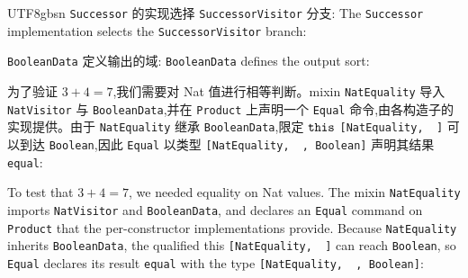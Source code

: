 \begin{CJK*}{UTF8}{gbsn}
\ifPaperChinese
  \texttt{Successor} 的实现选择 \texttt{SuccessorVisitor} 分支:
  \else
  The \texttt{Successor} implementation selects the \texttt{SuccessorVisitor} branch:
  \fi
{}

\ifPaperChinese
  \texttt{BooleanData} 定义输出的域:
  \else
  \texttt{BooleanData} defines the output sort:
  \fi
{}
\ifPaperChinese
  \begin{sloppypar}
  为了验证 $3 + 4 = 7$,我们需要对 Nat 值进行相等判断。mixin \texttt{NatEquality} 导入 \texttt{NatVisitor} 与 \texttt{BooleanData},并在 \texttt{Product} 上声明一个 \texttt{Equal} 命令,由各构造子的实现提供。由于 \texttt{NatEquality} 继承 \texttt{BooleanData},限定 $\mathtt{this}$ \texttt{[NatEquality, ~]} 可以到达 \texttt{Boolean},因此 \texttt{Equal} 以类型 \texttt{[NatEquality, ~, Boolean]} 声明其结果 \texttt{equal}:
  \end{sloppypar}
  \else
  \begin{sloppypar}
  To test that $3 + 4 = 7$, we needed equality on Nat values.
  The mixin \texttt{NatEquality} imports \texttt{NatVisitor} and \texttt{BooleanData},
  and declares an \texttt{Equal} command on \texttt{Product} that the per-constructor implementations provide.
  Because \texttt{NatEquality} inherits \texttt{BooleanData},
  the qualified this \texttt{[NatEquality, ~]} can reach \texttt{Boolean},
  so \texttt{Equal} declares its result
  \texttt{equal} with the type \texttt{[NatEquality, ~, Boolean]}:
  \end{sloppypar}
  \fi
{}


\end{CJK*}
